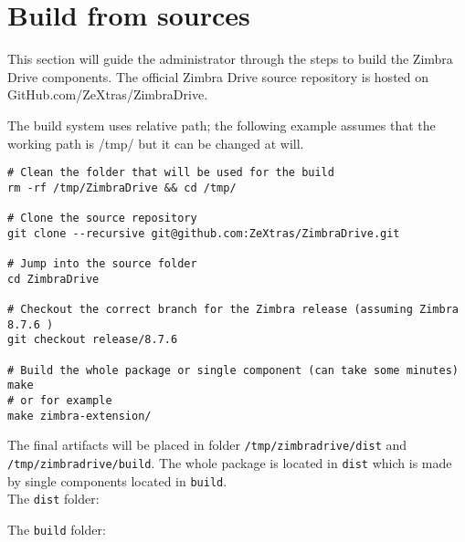 \section{Build from sources}
This section will guide the administrator through the steps to build the Zimbra Drive components.
The official Zimbra Drive source repository is hosted on GitHub.com/ZeXtras/ZimbraDrive.

The build system uses relative path; the following example assumes that the working path is /tmp/
but it can be changed at will.
\begin{verbatim}
# Clean the folder that will be used for the build
rm -rf /tmp/ZimbraDrive && cd /tmp/

# Clone the source repository
git clone --recursive git@github.com:ZeXtras/ZimbraDrive.git

# Jump into the source folder
cd ZimbraDrive

# Checkout the correct branch for the Zimbra release (assuming Zimbra 8.7.6 )
git checkout release/8.7.6

# Build the whole package or single component (can take some minutes)
make
# or for example
make zimbra-extension/
\end{verbatim}

The final artifacts will be placed in folder \texttt{/tmp/zimbradrive/dist} and \texttt{/tmp/zimbradrive/build}.
The whole package is located in \texttt{dist} which is made by single components located in \texttt{build}.\\
The \texttt{dist} folder:

The \texttt{build} folder:

